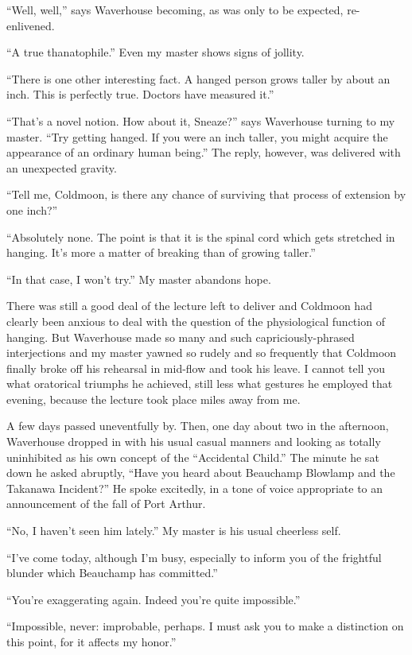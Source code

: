 \documentclass{book}
\begin{document}
``Well, well,'' says Waverhouse becoming, as was only to be expected,
re-enlivened.

``A true thanatophile.'' Even my master shows signs of jollity.

``There is one other interesting fact. A hanged person grows taller by
about an inch. This is perfectly true. Doctors have measured it.''

``That's a novel notion. How about it, Sneaze?'' says Waverhouse turning
to my master. ``Try getting hanged. If you were an inch taller, you
might acquire the appearance of an ordinary human being.'' The reply,
however, was delivered with an unexpected gravity.

``Tell me, Coldmoon, is there any chance of surviving that process of
extension by one inch?''

``Absolutely none. The point is that it is the spinal cord which gets
stretched in hanging. It's more a matter of breaking than of growing
taller.''

``In that case, I won't try.'' My master abandons hope.

There was still a good deal of the lecture left to deliver and Coldmoon
had clearly been anxious to deal with the question of the physiological
function of hanging. But Waverhouse made so many and such
capriciously-phrased interjections and my master yawned so rudely and so
frequently that Coldmoon finally broke off his rehearsal in mid-flow and
took his leave. I cannot tell you what oratorical triumphs he achieved,
still less what gestures he employed that evening, because the lecture
took place miles away from me.

A few days passed uneventfully by. Then, one day about two in the
afternoon, Waverhouse dropped in with his usual casual manners and
looking as totally uninhibited as his own concept of the ``Accidental
Child.'' The minute he sat down he asked abruptly, ``Have you heard
about Beauchamp Blowlamp and the Takanawa Incident?'' He spoke
excitedly, in a tone of voice appropriate to an announcement of the fall
of Port Arthur.

``No, I haven't seen him lately.'' My master is his usual cheerless
self.

``I've come today, although I'm busy, especially to inform you of the
frightful blunder which Beauchamp has committed.''

``You're exaggerating again. Indeed you're quite impossible.''

``Impossible, never: improbable, perhaps. I must ask you to make a
distinction on this point, for it affects my honor.''
\end{document}
